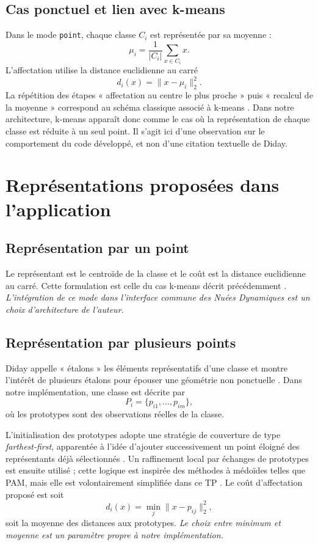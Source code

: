 \documentclass[12pt,a4paper]{article}
\begin{document}
\subsection{Cas ponctuel et lien avec k-means}

Dans le mode \texttt{point}, chaque classe $C_i$ est représentée par sa moyenne :
\[
\mu_i = \frac{1}{|C_i|}\sum_{x\in C_i}x.
\]
L'affectation utilise la distance euclidienne au carré
\[
d_i(x)=\|x-\mu_i\|_2^2.
\]
La répétition des étapes « affectation au centre le plus proche » puis « recalcul de la moyenne » correspond au schéma classique associé à k-means \cite{macqueen1967,lloyd1982}. Dans notre architecture, k-means apparaît donc comme le cas où la représentation de chaque classe est réduite à un seul point. Il s'agit ici d'une observation sur le comportement du code développé, et non d'une citation textuelle de Diday.

\section{Représentations proposées dans l'application}

\subsection{Représentation par un point}

Le représentant est le centroïde de la classe et le coût est la distance euclidienne au carré. Cette formulation est celle du cas k-means décrit précédemment \cite{macqueen1967,lloyd1982}. \textit{L'intégration de ce mode dans l'interface commune des Nuées Dynamiques est un choix d'architecture de l'auteur.}

\subsection{Représentation par plusieurs points}

Diday appelle « étalons » les éléments représentatifs d'une classe et montre l'intérêt de plusieurs étalons pour épouser une géométrie non ponctuelle \cite[pp.~21,25]{diday1971}. Dans notre implémentation, une classe est décrite par
\[
P_i=\{p_{i1},\ldots,p_{im}\},
\]
où les prototypes sont des observations réelles de la classe.

L'initialisation des prototypes adopte une stratégie de couverture de type \textit{farthest-first}, apparentée à l'idée d'ajouter successivement un point éloigné des représentants déjà sélectionnés \cite{gonzalez1985}. Un raffinement local par échanges de prototypes est ensuite utilisé ; cette logique est inspirée des méthodes à médoïdes telles que PAM, mais elle est volontairement simplifiée dans ce TP \cite{kaufman1990}. Le coût d'affectation proposé est soit
\[
d_i(x)=\min_j \|x-p_{ij}\|_2^2,
\]
soit la moyenne des distances aux prototypes. \textit{Le choix entre minimum et moyenne est un paramètre propre à notre implémentation.}
\end{document}
